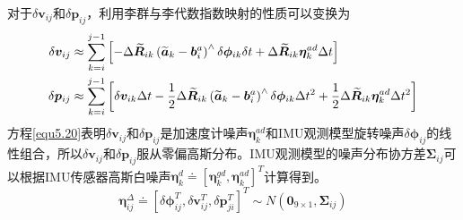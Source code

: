 对于$\delta \boldsymbol{v}_{ij}$和$\delta \boldsymbol{p}_{ij}$，利用李群与李代数指数映射的性质可以变换为
\begin{equation}
\label{equ5.20}
\begin{aligned}
\delta \boldsymbol{v}_{ij} &\approx \sum\limits_{k=i}^{j-1} \left[ - \Delta \widetilde{\boldsymbol{R}}_{ik} \left( \widetilde{\boldsymbol{a}}_k - \boldsymbol{b}_i^a  \right) ^{\wedge} \delta \boldsymbol{\phi}_{ik} \delta t + \Delta \widetilde{\boldsymbol{R}}_{ik} \boldsymbol{\eta}_k^{ad} \Delta t   \right] 
\\ 
\delta \boldsymbol{p}_{ij} &\approx \sum\limits_{k=i}^{j-1} \left[ \delta \boldsymbol{v}_{ik} \Delta t -{1 \over 2} \Delta \widetilde{\boldsymbol{R}}_{ik} \left( \widetilde{\boldsymbol{a}}_k - \boldsymbol{b}_i^a  \right) ^{\wedge} \delta \boldsymbol{\phi}_{ik} \Delta t^2 + { 1 \over 2} \Delta \widetilde{\boldsymbol{R}}_{ik} \boldsymbol{\eta}_k^{ad} \Delta t^2 \right]
\end{aligned}
\end{equation}
方程\eqref{equ5.20}表明$\delta \boldsymbol{v}_{ij}$和$\delta \boldsymbol{p}_{ij}$是加速度计噪声$\boldsymbol{\eta}_k^{ad}$和IMU观测模型旋转噪声$\delta \boldsymbol{\phi}_{ij}$的线性组合，所以$\delta \boldsymbol{v}_{ij}$和$\delta \boldsymbol{p}_{ij}$服从零偏高斯分布。IMU观测模型的噪声分布协方差$\boldsymbol{\Sigma}_{ij}$可以根据IMU传感器高斯白噪声$\boldsymbol{\eta}_k^d \doteq [\boldsymbol{\eta}_k^{gd}, \boldsymbol{\eta}_k^{ad}]^T$计算得到。
\begin{equation}
\label{equ5.21}
\boldsymbol{\eta}_{ij}^{\Delta} \doteq \left[ \delta \boldsymbol{\phi}_{ij}^T, \delta \boldsymbol{v}_{ij}^T, \delta \boldsymbol{p}_{ji}^T \right]^T \sim N \left( \boldsymbol{0}_{9 \times 1}, \boldsymbol{\Sigma}_{ij}  \right)
\end{equation}



